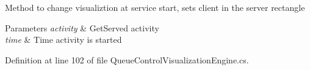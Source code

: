 Method to change visualiztion at service start, sets client in the server rectangle 


\begin{DoxyParams}{Parameters}
{\em activity} & Get\+Served activity\\
\hline
{\em time} & Time activity is started\\
\hline
\end{DoxyParams}


Definition at line 102 of file Queue\+Control\+Visualization\+Engine.\+cs.

